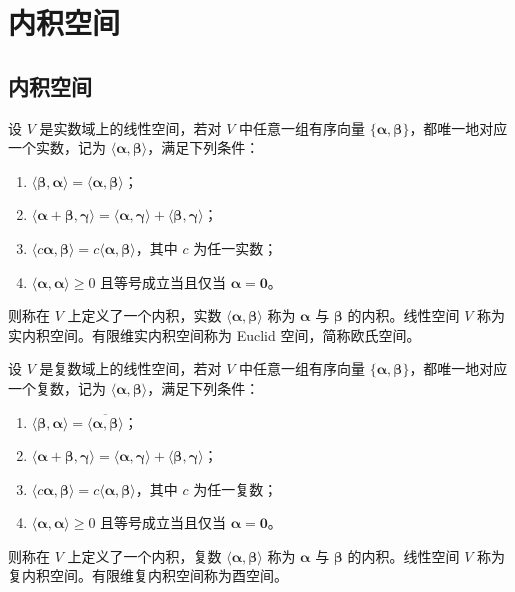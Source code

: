 \chapter{内积空间}


\section{内积空间}

\begin{definition}
    设 $V$ 是实数域上的线性空间，若对 $V$ 中任意一组有序向量 $\{\bm{\alpha}, \bm{\beta}\}$，都唯一地对应一个实数，记为 $\langle \bm{\alpha}, \bm{\beta} \rangle$，满足下列条件：
    \begin{enumerate}
        \item $\langle \bm{\beta}, \bm{\alpha} \rangle = \langle \bm{\alpha}, \bm{\beta} \rangle$；
        \item $\langle \bm{\alpha} + \bm{\beta}, \bm{\gamma} \rangle = \langle \bm{\alpha}, \bm{\gamma} \rangle + \langle \bm{\beta}, \bm{\gamma} \rangle$；
        \item $\langle c\bm{\alpha}, \bm{\beta} \rangle = c\langle \bm{\alpha}, \bm{\beta} \rangle$，其中 $c$ 为任一实数；
        \item $\langle \bm{\alpha}, \bm{\alpha} \rangle \geqslant 0$ 且等号成立当且仅当 $\bm{\alpha} = \bm{0}$。
    \end{enumerate}
    则称在 $V$ 上定义了一个内积，实数 $\langle \bm{\alpha}, \bm{\beta} \rangle$ 称为 $\bm{\alpha}$ 与 $\bm{\beta}$ 的内积。线性空间 $V$ 称为实内积空间。有限维实内积空间称为 Euclid 空间，简称欧氏空间。
\end{definition}

\begin{definition}
    设 $V$ 是复数域上的线性空间，若对 $V$ 中任意一组有序向量 $\{\bm{\alpha}, \bm{\beta}\}$，都唯一地对应一个复数，记为 $\langle \bm{\alpha}, \bm{\beta} \rangle$，满足下列条件：
    \begin{enumerate}
        \item $\langle \bm{\beta}, \bm{\alpha} \rangle = \overline{\langle \bm{\alpha}, \bm{\beta} \rangle}$；
        \item $\langle \bm{\alpha} + \bm{\beta}, \bm{\gamma} \rangle = \langle \bm{\alpha}, \bm{\gamma} \rangle + \langle \bm{\beta}, \bm{\gamma} \rangle$；
        \item $\langle c\bm{\alpha}, \bm{\beta} \rangle = c\langle \bm{\alpha}, \bm{\beta} \rangle$，其中 $c$ 为任一复数；
        \item $\langle \bm{\alpha}, \bm{\alpha} \rangle \geqslant 0$ 且等号成立当且仅当 $\bm{\alpha} = \bm{0}$。
    \end{enumerate}
    则称在 $V$ 上定义了一个内积，复数 $\langle \bm{\alpha}, \bm{\beta} \rangle$ 称为 $\bm{\alpha}$ 与 $\bm{\beta}$ 的内积。线性空间 $V$ 称为复内积空间。有限维复内积空间称为酉空间。
\end{definition}

